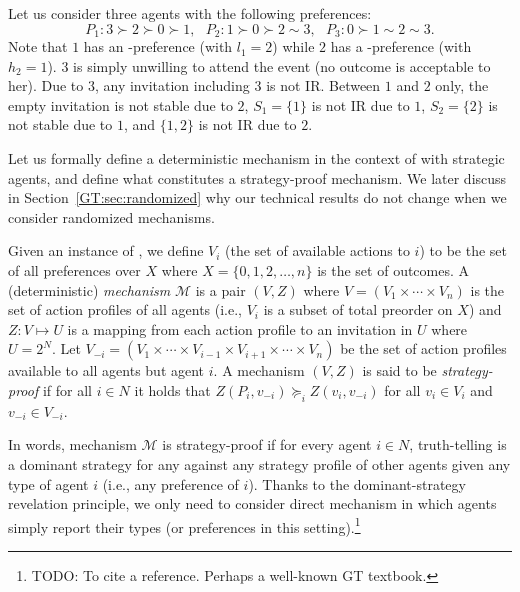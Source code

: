 \begin{example} \label{GT:eg:noStableSet}
	Let us consider three agents with the following preferences: 
	\begin{equation*}
				P_1: 3\succ 2 \succ 0 \succ 1,~~~ P_2: 1 \succ 0 \succ 2 \sim 3,~~~ P_3: 0 \succ 1 \sim 2 \sim 3.
	\end{equation*}
	Note that $1$ has an \INC-preference (with $l_1 = 2$) while $2$ has a \DEC-preference (with  $h_2 = 1$). $3$ is simply unwilling to attend the event (no outcome is acceptable to her).
	Due to $3$, any invitation including $3$ is not IR. Between $1$ and $2$ only, the empty invitation is not stable due to $2$, $S_1 = \{1\}$ is not IR due to $1$, $S_2 = \{2\}$ is not stable due to $1$, and $\{1, 2\}$ is not IR due to $2$.
\end{example}

Let us formally define a deterministic mechanism in the context of \AOIPs with strategic agents, and define what constitutes a strategy-proof mechanism. We later discuss in Section~\ref{GT:sec:randomized} why our technical results do not change when we consider randomized mechanisms.

\begin{definition} \label{GT:def:mechanism}
Given an instance of \AOIP, we define $V_i$ (the set of available actions to $i$) to be the set of all preferences over $X$ where $X = \{0, 1, 2, \dots, n\}$ is the set of outcomes. 
A (deterministic) \emph{mechanism} $\mathcal{M}$ is a pair $(V, Z)$ where $V = (V_1 \times \cdots \times V_n)$ is the set of action profiles of all agents (i.e., $V_i$ is a subset of total preorder on $X$) and $Z: V \mapsto U$ is a mapping from each action profile to an invitation in $U$ where $U = 2^{N}$. 
Let $V_{-i} = (V_1 \times \cdots \times V_{i-1} \times V_{i+1} \times \cdots \times V_{n})$ be the set of action profiles available to all agents but agent $i$. A mechanism $(V, Z)$ is said to be \emph{strategy-proof} if for all $i\in N$ it holds that $Z(P_i, v_{-i}) \succeq_i Z(v_i, v_{-i})$ for all $v_i \in V_i$ and $v_{-i} \in V_{-i}$.
\end{definition}

In words, mechanism $\mathcal{M}$ is strategy-proof if for every agent $i\in N$, truth-telling is a dominant strategy for any against any strategy profile of other agents given any type of agent $i$ (i.e., any preference of $i$). Thanks to the dominant-strategy revelation principle, we only need to consider direct mechanism in which agents simply report their types (or preferences in this setting).\footnote{TODO: To cite a reference. Perhaps a well-known GT textbook.}





